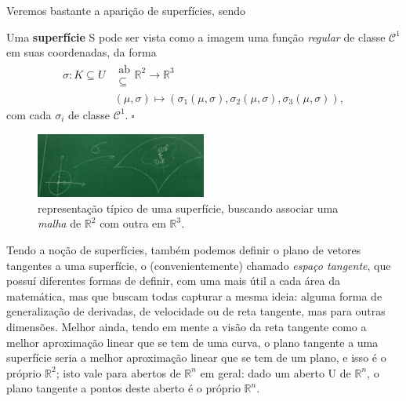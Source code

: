 \documentclass[../differential_forms.tex]{subfiles}
\begin{document}
Veremos bastante a aparição de superfícies, sendo
\begin{def*}
	Uma \textbf{superfície} S pode ser vista como a imagem uma função \textit{regular} de classe \(\mathcal{C}^{1}\) em suas coordenadas, da forma
	\begin{align*}
		\sigma :  K\subseteq U & \substack{\mathrm{ab}                                                                                   \\ \subseteq }\mathbb{R}^{2}\rightarrow \mathbb{R}^{3} \\
		                       & (\mu , \sigma )\longmapsto (\sigma_1(\mu , \sigma ), \sigma_2(\mu , \sigma ), \sigma_3(\mu , \sigma )),
	\end{align*}
	com cada \(\sigma_{i}\) de classe \(\mathcal{C}^{1}.\; \square\)
\end{def*}
\begin{figure}[H]
	\begin{center}
		\includegraphics[height=0.5\textheight, width=0.5\textwidth, keepaspectratio]{./Images/surface_01.png}
	\end{center}
	\caption{representação típico de uma superfície, buscando associar uma \textit{malha} de \(\mathbb{R}^{2}\) com outra em \(\mathbb{R}^{3}\).}
\end{figure}

Tendo a noção de superfícies, também podemos definir o plano de vetores tangentes a uma superfície, o (convenientemente) chamado \textit{espaço tangente}, que possuí diferentes formas de definir, com uma mais útil a cada área da matemática, mas que buscam todas capturar a mesma ideia: alguma forma de generalização de derivadas, de velocidade ou de reta tangente, mas para outras dimensões. Melhor ainda, tendo em mente a visão da reta tangente como a melhor aproximação linear que se tem de uma curva, o plano tangente a uma superfície seria a melhor aproximação linear que se tem de um plano, e isso é o próprio \(\mathbb{R}^{2}\); isto vale para abertos de \(\mathbb{R}^{n}\) em geral: dado um aberto U de \(\mathbb{R}^{n}\), o plano tangente a pontos deste aberto é o próprio \(\mathbb{R}^{n}.\)
\end{document}

